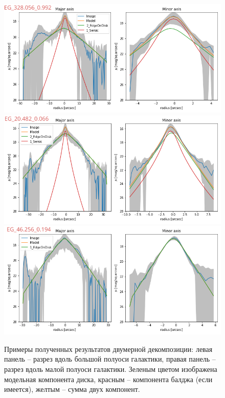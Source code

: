 \begin{figure}[p]
    \centering
    \includegraphics[width=.9\textwidth]{plot_results/4.png}\hfill\\
    \includegraphics[width=.9\textwidth]{plot_results/6.png}\hfill\\
    \includegraphics[width=.9\textwidth]{plot_results/5.png}\hfill\\

    \caption{Примеры полученных результатов двумерной декомпозиции: левая панель -- разрез вдоль большой полуоси галактики, правая панель -- разрез вдоль малой полуоси галактики. Зеленым цветом изображена модельная компонента диска, красным -- компонента балджа (если имеется), желтым -- сумма двух компонент. }\label{fig:slices}
\end{figure}

